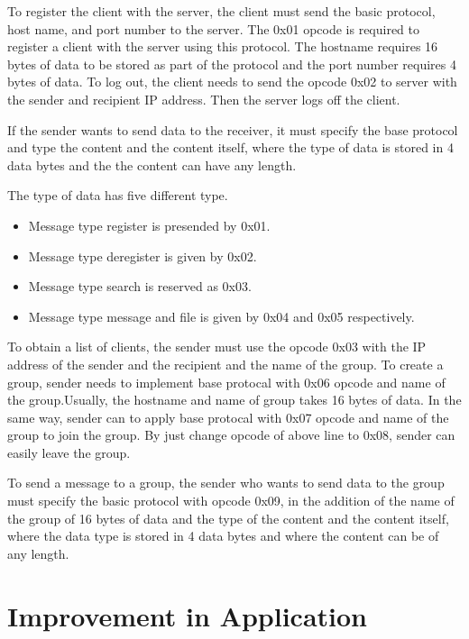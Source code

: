     \noindent
    To register the client with the server, the client must send the basic protocol, host
     name, and port number to the server. 
    The 0x01 opcode is required to register a client with the server using this protocol.
    The hostname requires 16 bytes of data to be stored as part of the protocol and 
    the port number requires 4 bytes of data.
    To log out, the client  needs to send the opcode 0x02 to server  with the sender and
    recipient IP address.
    Then the server logs off the client.
     \medskip
    
    \noindent
    If the sender wants to send data to the receiver, it must specify the base protocol and type
    the content and the content itself, where the type of data is stored in 4 data bytes and the
    the content can have any length. 
 
    The type of  data has five different type.
    \begin{itemize}
    	\item Message type register is presended by 0x01.
    	\item Message type deregister is given  by 0x02.
    	\item Message type search is reserved as 0x03.
    	\item Message type message and file is given by 0x04 and 0x05 respectively.
    \end{itemize}
	 \medskip
	
	\noindent
	To obtain a list of clients, the sender must use the opcode 0x03 with the IP address of the sender 
	and the recipient and the name of the group.
	To create a group, sender needs to implement base protocal with 0x06 opcode and name 
	of the group.Usually, the hostname and name of group takes 16 bytes of data.
	In the same way, sender can to apply  base protocal with 0x07 opcode and name 
	of the group to join the group.
	By just change opcode of above line to 0x08, sender can easily leave the group.
	
	To send a message to a group, the sender who wants to send data to the group must specify
	 the basic protocol  with opcode 0x09, in the addition of the name of the group of 16 bytes 
	 of data and the type of the content and the content itself, where the data type is stored 
	 in 4 data bytes and where the content can be of any length. 
    \medskip

    \noindent
    
    \section{Improvement in Application}\label{sec:improvement in application}

